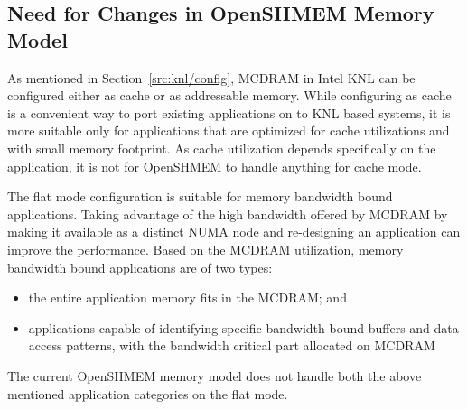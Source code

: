 
\subsection{Need for Changes in OpenSHMEM Memory Model}
\label{src:mmodel/drelated}
As mentioned in Section~\ref{src:knl/config}, MCDRAM in Intel KNL can be
configured either as cache or as addressable memory. While configuring as
cache is a convenient way to port existing applications on to KNL based
systems, it is more suitable only for applications that are optimized for
cache utilizations and with small memory footprint. As cache utilization
depends specifically on the application, it is not for OpenSHMEM to handle
anything for cache mode.

The flat mode configuration is suitable for memory bandwidth bound
applications. Taking advantage of the high bandwidth offered by MCDRAM by
making it available as a distinct NUMA node and re-designing an application
can improve the performance. Based on the MCDRAM utilization, memory
bandwidth bound applications are of two types:
\begin{itemize}
    \item the entire application memory fits in the MCDRAM; and
    \item applications capable of identifying specific bandwidth bound
    buffers and data access patterns,
    with the bandwidth critical part
    allocated on MCDRAM
\end{itemize}
The current OpenSHMEM memory model %
does not handle both the above
mentioned application categories on the flat mode.
